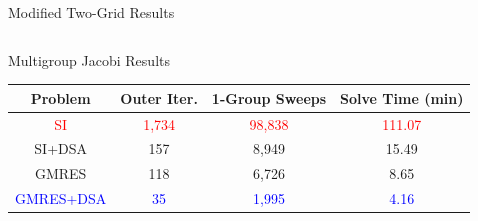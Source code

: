 \documentclass[compress,10pt]{beamer}
\newcommand{\tcr}[1]{\textcolor{red}{#1}}
\newcommand{\tcb}[1]{\textcolor{blue}{#1}}
\begin{document}
\begin{frame}[t]
{{\begin{block}{Modified Two-Grid Results}
\begin{table}
\begin{tabular}{|c|c|c|c|}
\end{tabular}
\end{table}
\end{block}
\vspace{-3mm}
\begin{block}{Multigroup Jacobi Results}
\begin{table}
\begin{tabular}{|c|c|c|c|}
\hline
Problem & Outer Iter.  & 1-Group Sweeps & Solve Time (min)  \\
\hline \hline
\tcr{SI}  & \tcr{1,734} & \tcr{98,838} &  \tcr{111.07} \\ \hline
SI+DSA & 157 & 8,949 &  15.49 \\ \hline
GMRES  & 118 & 6,726 &  8.65 \\ \hline
\tcb{GMRES+DSA} & \tcb{35} & \tcb{1,995} &  \tcb{4.16} \\ \hline
\end{tabular}
\end{table}
\end{block}
}
}
\end{frame}
\end{document}
